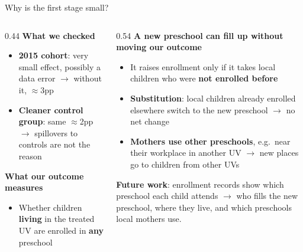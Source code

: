 \documentclass[aspectratio=169,10pt]{beamer}
\newcommand{\takeaway}[1]{\par\vspace{6pt}{\small\textcolor{steel}{$\Rightarrow$}\ \textbf{\textcolor{navy}{#1}}}}
\begin{document}
\begin{frame}{Why is the first stage small?}
\begin{columns}[T]
\begin{column}{0.44\textwidth}
{\small\textcolor{steel}{\textbf{What we checked}}}
\begin{itemize}
  \footnotesize
  \item \textbf{2015 cohort}: very small effect, possibly a data error $\to$ without it, $\approx$3pp
  \item \textbf{Cleaner control group}: same $\approx$2pp $\to$ spillovers to controls are not the reason
\end{itemize}

\vspace{6pt}
{\small\textcolor{steel}{\textbf{What our outcome measures}}}
\begin{itemize}
  \footnotesize
  \item Whether children \textbf{living} in the treated UV are enrolled in \textbf{any} preschool
\end{itemize}
\end{column}
\begin{column}{0.54\textwidth}
{\small\textcolor{steel}{\textbf{A new preschool can fill up without moving our outcome}}}
\begin{itemize}
  \footnotesize
  \item It raises enrollment only if it takes local children who were \textbf{not enrolled before}
  \item \textbf{Substitution}: local children already enrolled elsewhere switch to the new preschool $\to$ no net change
  \item \textbf{Mothers use other preschools}, e.g.\ near their workplace in another UV $\to$ new places go to children from other UVs
\end{itemize}

\vspace{6pt}
\colorbox{bgpanel}{\parbox{0.95\linewidth}{\raggedright\footnotesize
\textbf{Future work}: enrollment records show which preschool each child attends $\to$ who fills the new preschool, where they live, and which preschools local mothers use.}}
\end{column}
\end{columns}
\takeaway{Enrollment of local children can move little, even if the new preschool fills up.}
\end{frame}
\end{document}
